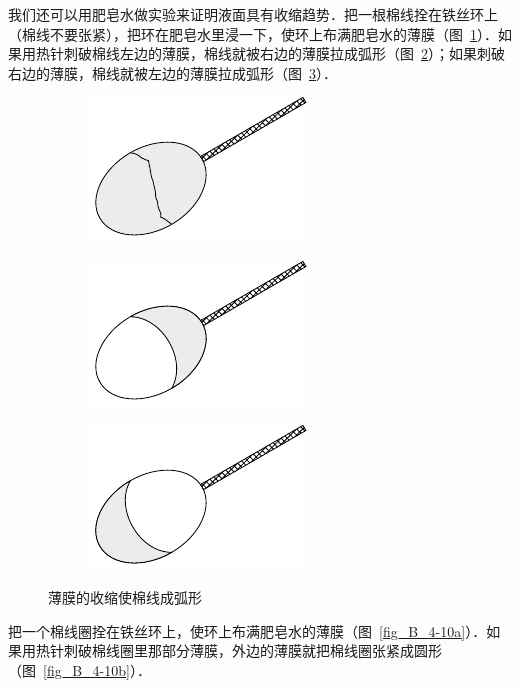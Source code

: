 我们还可以用肥皂水做实验来证明液面具有收缩趋势．把一根棉线拴在铁丝环上（棉线不要张紧），把环在肥皂水里浸一下，使环上布满肥皂水的薄膜（图~\ref{fig_B_4-9a}）．如果用热针刺破棉线左边的薄膜，棉线就被右边的薄膜拉成弧形（图~\ref{fig_B_4-9b}）；如果刺破右边的薄膜，棉线就被左边的薄膜拉成弧形（图~\ref{fig_B_4-9c}）．
\begin{figure}[htbp]
    \centering
    \begin{subfigure}{0.3\linewidth}
        \centering
        \includegraphics{fig/B/4-9a.pdf}
        \caption{}\label{fig_B_4-9a}
    \end{subfigure}
    \hfil
    \begin{subfigure}{0.3\linewidth}
        \centering
        \includegraphics{fig/B/4-9b.pdf}
        \caption{}\label{fig_B_4-9b}
    \end{subfigure}
    \hfil
    \begin{subfigure}{0.3\linewidth}
        \centering
        \includegraphics{fig/B/4-9c.pdf}
        \caption{}\label{fig_B_4-9c}
    \end{subfigure}
    \caption{薄膜的收缩使棉线成弧形}\label{fig_B_4-9}
\end{figure}



把一个棉线圈拴在铁丝环上，使环上布满肥皂水的薄膜（图~\ref{fig_B_4-10a}）．如果用热针刺破棉线圈里那部分薄膜，外边的薄膜就把棉线圈张紧成圆形（图~\ref{fig_B_4-10b}）．



